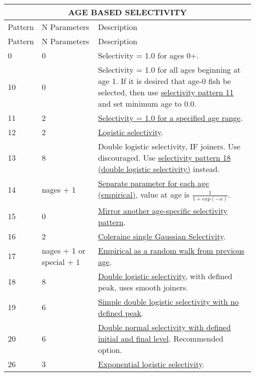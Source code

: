 \begin{longtable}{p{2cm} p{3cm} p{10cm}}
	\multicolumn{3}{c}{AGE BASED SELECTIVITY} \\
	\endfirsthead

	\hline
	Pattern & N Parameters & Description \Tstrut\Bstrut\\
	\hline
	\endhead

	\hline
	\endfoot
	\endlastfoot
	
	\hline
	Pattern & N Parameters & Description \Tstrut\Bstrut\\
	\hline
	0  \Tstrut & 0 & Selectivity = 1.0 for ages 0+.\\
	10 \Tstrut & 0 & Selectivity = 1.0 for all ages beginning at age 1. If it is desired that age-0 fish be selected, then use \hyperlink{DoubleLogSelectivity}{selectivity pattern 11} and set minimum age to 0.0. \\
	11 \Tstrut & 2 & \hyperlink{SelectivityOneRange}{Selectivity = 1.0 for a specified age range}. \\
	12 \Tstrut & 2 & \hyperlink{LogisticSelectivity}{Logistic selectivity}. \\
	13 \Tstrut & 8 & Double logistic selectivity, IF joiners. Use discouraged. Use \hyperlink{DoubleLogSelectivity}{selectivity pattern 18 (double logistic selectivity)} instead. \\
	14 \Tstrut & nages + 1 & \hyperlink{ReviseAge}{Separate parameter for each age (empirical)}, value at age is $\frac{1}{1+exp(-x)}$. \\
	15 \Tstrut & 0 & \hyperlink{MirrorAnotherSelectivity}{Mirror another age-specific selectivity pattern}. \\
	16 \Tstrut & 2 & \hyperlink{GaussianSelectivity}{Coleraine single Gaussian Selectivity}. \\
	17 \Tstrut & nages + 1 or special + 1 & \hyperlink{RandomWalk}{Empirical as a random walk from previous age}. \\
	18 \Tstrut & 8 & \hyperlink{DoubleLogSelectivity}{Double logistic selectivity}, with defined peak, uses smooth joiners. \\
	19 \Tstrut & 6 & \hyperlink{SimpleDoubleLog}{Simple double logistic selectivity with no defined peak}. \\
	20 \Tstrut & 6 & \hyperlink{DoubleNormalPeak}{Double normal selectivity with defined initial and final level}. Recommended option. \\
	26 \Tstrut & 3 & \hyperlink{ExponentialLogistic}{Exponential logistic selectivity}. \\

\end{longtable}
